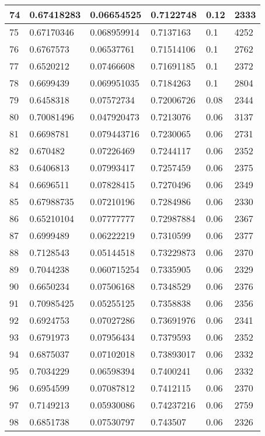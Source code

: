\begin{longtable}{|l|l|l|l|l|l|}
74 & 0.67418283 & 0.06654525 & 0.7122748 & 0.12 & 2333 \\ \hline 
75 & 0.67170346 & 0.068959914 & 0.7137163 & 0.1 & 4252 \\ \hline 
76 & 0.6767573 & 0.06537761 & 0.71514106 & 0.1 & 2762 \\ \hline 
77 & 0.6520212 & 0.07466608 & 0.71691185 & 0.1 & 2372 \\ \hline 
78 & 0.6699439 & 0.069951035 & 0.7184263 & 0.1 & 2804 \\ \hline 
79 & 0.6458318 & 0.07572734 & 0.72006726 & 0.08 & 2344 \\ \hline 
80 & 0.70081496 & 0.047920473 & 0.7213076 & 0.06 & 3137 \\ \hline 
81 & 0.6698781 & 0.079443716 & 0.7230065 & 0.06 & 2731 \\ \hline 
82 & 0.670482 & 0.07226469 & 0.7244117 & 0.06 & 2352 \\ \hline 
83 & 0.6406813 & 0.07993417 & 0.7257459 & 0.06 & 2375 \\ \hline 
84 & 0.6696511 & 0.07828415 & 0.7270496 & 0.06 & 2349 \\ \hline 
85 & 0.67988735 & 0.07210196 & 0.7284986 & 0.06 & 2330 \\ \hline 
86 & 0.65210104 & 0.07777777 & 0.72987884 & 0.06 & 2367 \\ \hline 
87 & 0.6999489 & 0.06222219 & 0.7310599 & 0.06 & 2377 \\ \hline 
88 & 0.7128543 & 0.05144518 & 0.73229873 & 0.06 & 2370 \\ \hline 
89 & 0.7044238 & 0.060715254 & 0.7335905 & 0.06 & 2329 \\ \hline 
90 & 0.6650234 & 0.07506168 & 0.7348529 & 0.06 & 2376 \\ \hline 
91 & 0.70985425 & 0.05255125 & 0.7358838 & 0.06 & 2356 \\ \hline 
92 & 0.6924753 & 0.07027286 & 0.73691976 & 0.06 & 2341 \\ \hline 
93 & 0.6791973 & 0.07956434 & 0.7379593 & 0.06 & 2352 \\ \hline 
94 & 0.6875037 & 0.07102018 & 0.73893017 & 0.06 & 2332 \\ \hline 
95 & 0.7034229 & 0.06598394 & 0.7400241 & 0.06 & 2332 \\ \hline 
96 & 0.6954599 & 0.07087812 & 0.7412115 & 0.06 & 2370 \\ \hline 
97 & 0.7149213 & 0.05930086 & 0.74237216 & 0.06 & 2759 \\ \hline 
98 & 0.6851738 & 0.07530797 & 0.743507 & 0.06 & 2326 \\ \hline 

\end{longtable}
